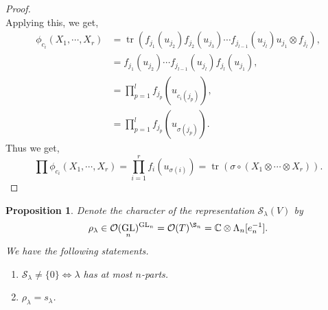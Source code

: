 \documentclass[10pt]{article}
\newtheorem{proposition}{Proposition}[section]
\numberwithin{equation}{theorem}
\DeclareMathOperator{\tr}{tr}
\DeclareMathOperator{\GL}{GL}
\newcommand{\Ouv}[0]{\mathcal{O}}
\newcommand{\C}[0]{\mathbb{C}}
\begin{document}
\begin{proof}
\begin{equation*}
  \end{equation*}
  Applying this, we get,
  \begin{align*}
    \phi_{c_i}(X_1,\cdots,X_r) & = \tr(f_{j_1}(u_{j_2})f_{j_2}(u_{j_3})\cdots f_{j_{l-1}}(u_{j_l})u_{j_1}\otimes f_{j_l}),\\
    & = f_{j_1}(u_{j_2})\cdots f_{j_{l-1}}(u_{j_l})f_{j_l}(u_{j_1}),\\
    & = \prod_{p=1}^l f_{j_p}(u_{c_i(j_p)}),\\
    & = \prod_{p=1}^l f_{j_p}(u_{\sigma(j_p)}).
  \end{align*}
  Thus we get,
  \begin{equation*}
    \prod\phi_{c_i}(X_1,\cdots,X_r) = \prod_{i=1}^r f_i(u_{\sigma(i)})=\tr(\sigma\circ(X_1\otimes \cdots\otimes X_r)).
  \end{equation*}
\end{proof}
\begin{proposition}
  \label{proposition_4_10}
  Denote the character of the representation $\mathcal{S}_\lambda(V)$ by 
  \begin{equation*}
    \rho_\lambda\in\Ouv(\GL_n)^{\GL_n} = \Ouv(T)^{\S_n} = \C\otimes \Lambda_n[e_n^{-1}].
  \end{equation*}
  We have the following statements.
  \begin{enumerate}[1).]
    \item $\mathcal{S}_\lambda \not=\{0\}\Leftrightarrow\lambda $ has at most $n$-parts.
    \item $\rho_\lambda = s_\lambda$.
  \end{enumerate}
\end{proposition}
\end{document}
